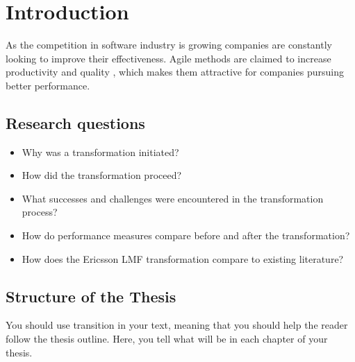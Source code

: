
\chapter{Introduction}
\label{chapter:intro}


As the competition in software industry is growing companies are constantly
looking to improve their effectiveness. Agile methods are claimed to increase
productivity and quality \cite{Livermore2008}, which makes them attractive
for companies pursuing better performance.


\section{Research questions}

\begin{itemize}
  \item Why was a transformation initiated?
  \item How did the transformation proceed?
  \item What successes and challenges were encountered in the transformation
        process?
  \item How do performance measures compare before and after the transformation?
  \item How does the Ericsson LMF transformation compare to existing literature?
\end{itemize}


\section{Structure of the Thesis}
\label{section:structure}

You should use transition in your text, meaning that you should help
the reader follow the thesis outline. Here, you tell what will be in
each chapter of your thesis. 

